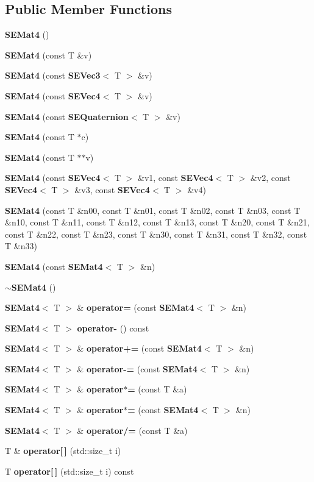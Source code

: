 \subsection*{Public Member Functions}
\begin{DoxyCompactItemize}
\item 
{\bf S\+E\+Mat4} ()
\item 
{\bf S\+E\+Mat4} (const T \&v)
\item 
{\bf S\+E\+Mat4} (const {\bf S\+E\+Vec3}$<$ T $>$ \&v)
\item 
{\bf S\+E\+Mat4} (const {\bf S\+E\+Vec4}$<$ T $>$ \&v)
\item 
{\bf S\+E\+Mat4} (const {\bf S\+E\+Quaternion}$<$ T $>$ \&v)
\item 
{\bf S\+E\+Mat4} (const T $\ast$c)
\item 
{\bf S\+E\+Mat4} (const T $\ast$$\ast$v)
\item 
{\bf S\+E\+Mat4} (const {\bf S\+E\+Vec4}$<$ T $>$ \&v1, const {\bf S\+E\+Vec4}$<$ T $>$ \&v2, const {\bf S\+E\+Vec4}$<$ T $>$ \&v3, const {\bf S\+E\+Vec4}$<$ T $>$ \&v4)
\item 
{\bf S\+E\+Mat4} (const T \&n00, const T \&n01, const T \&n02, const T \&n03, const T \&n10, const T \&n11, const T \&n12, const T \&n13, const T \&n20, const T \&n21, const T \&n22, const T \&n23, const T \&n30, const T \&n31, const T \&n32, const T \&n33)
\item 
{\bf S\+E\+Mat4} (const {\bf S\+E\+Mat4}$<$ T $>$ \&n)
\item 
{\bf $\sim$\+S\+E\+Mat4} ()
\item 
{\bf S\+E\+Mat4}$<$ T $>$ \& {\bf operator=} (const {\bf S\+E\+Mat4}$<$ T $>$ \&n)
\item 
{\bf S\+E\+Mat4}$<$ T $>$ {\bf operator-\/} () const 
\item 
{\bf S\+E\+Mat4}$<$ T $>$ \& {\bf operator+=} (const {\bf S\+E\+Mat4}$<$ T $>$ \&n)
\item 
{\bf S\+E\+Mat4}$<$ T $>$ \& {\bf operator-\/=} (const {\bf S\+E\+Mat4}$<$ T $>$ \&n)
\item 
{\bf S\+E\+Mat4}$<$ T $>$ \& {\bf operator$\ast$=} (const T \&a)
\item 
{\bf S\+E\+Mat4}$<$ T $>$ \& {\bf operator$\ast$=} (const {\bf S\+E\+Mat4}$<$ T $>$ \&n)
\item 
{\bf S\+E\+Mat4}$<$ T $>$ \& {\bf operator/=} (const T \&a)
\item 
T \& {\bf operator[$\,$]} (std\+::size\+\_\+t i)
\item 
T {\bf operator[$\,$]} (std\+::size\+\_\+t i) const 
$$
\end{DoxyCompactItemize}
